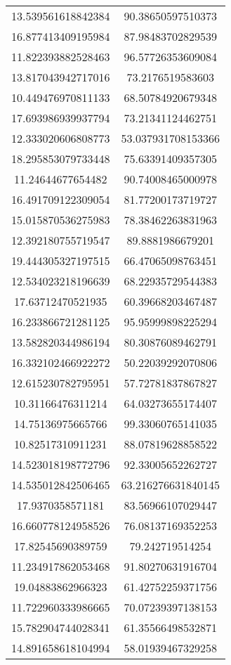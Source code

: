 \begin{table}
\begin{tabular}{cc}
13.539561618842384 & 90.38650597510373 \\
16.877413409195984 & 87.98483702829539 \\
11.822393882528463 & 96.57726353609084 \\
13.817043942717016 & 73.2176519583603 \\
10.449476970811133 & 68.50784920679348 \\
17.693986939937794 & 73.21341124462751 \\
12.333020606808773 & 53.037931708153366 \\
18.295853079733448 & 75.63391409357305 \\
11.24644677654482 & 90.74008465000978 \\
16.491709122309054 & 81.77200173719727 \\
15.015870536275983 & 78.38462263831963 \\
12.392180755719547 & 89.8881986679201 \\
19.444305327197515 & 66.47065098763451 \\
12.534023218196639 & 68.22935729544383 \\
17.63712470521935 & 60.39668203467487 \\
16.233866721281125 & 95.95999898225294 \\
13.582820344986194 & 80.30876089462791 \\
16.332102466922272 & 50.22039292070806 \\
12.615230782795951 & 57.72781837867827 \\
10.31166476311214 & 64.03273655174407 \\
14.75136975665766 & 99.33060765141035 \\
10.82517310911231 & 88.07819628858522 \\
14.523018198772796 & 92.33005652262727 \\
14.535012842506465 & 63.216276631840145 \\
17.9370358571181 & 83.56966107029447 \\
16.660778124958526 & 76.08137169352253 \\
17.82545690389759 & 79.242719514254 \\
11.234917862053468 & 91.80270631916704 \\
19.04883862966323 & 61.42752259371756 \\
11.722960333986665 & 70.07239397138153 \\
15.782904744028341 & 61.35566498532871 \\
14.891658618104994 & 58.01939467329258 \\

\end{tabular}
\end{table}

